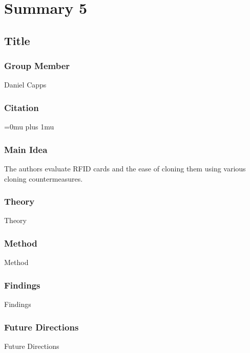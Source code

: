 \section{Summary 5}

\noindent
\subsection{Title}

\subsubsection{Group Member}

\noindent
Daniel Capps

\noindent
\subsubsection{Citation}

\Urlmuskip=0mu plus 1mu\relax

\subsubsection{Main Idea}

\noindent
 The authors evaluate RFID cards and the ease of cloning them using various cloning countermeasures.

\subsubsection{Theory}

\noindent
Theory

\subsubsection{Method}

\noindent
Method

\subsubsection{Findings}

\noindent
Findings

\subsubsection{Future Directions}

\noindent
Future Directions 

